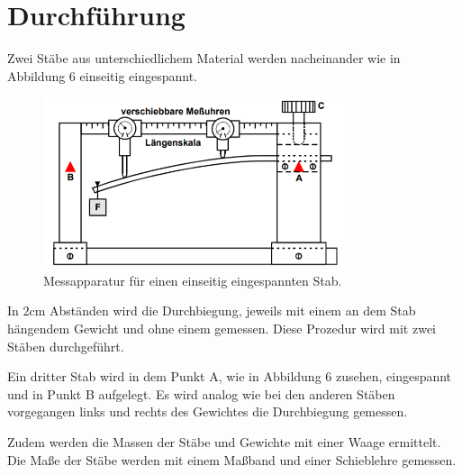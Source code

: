 \section{Durchführung}
\label{sec:Durchführung}


Zwei Stäbe aus unterschiedlichem Material werden nacheinander wie in Abbildung 6 einseitig eingespannt.

\begin{figure}[H]
  \centering
  \includegraphics[height=5cm]{einseitig.PNG}
  \caption{Messapparatur für einen einseitig eingespannten Stab. \cite{sample}}
  \label{fig:einseitig}
\end{figure}

In $2$cm Abständen wird die Durchbiegung, jeweils mit einem an dem Stab hängendem Gewicht
und ohne einem gemessen. Diese Prozedur wird mit zwei Stäben durchgeführt.

Ein dritter Stab wird in dem Punkt A, wie in Abbildung 6 zusehen, eingespannt und
in Punkt B aufgelegt. Es wird analog wie bei den anderen Stäben vorgegangen links
und rechts des Gewichtes die Durchbiegung gemessen.

Zudem werden die Massen der Stäbe und Gewichte mit einer Waage ermittelt. Die Maße der
Stäbe werden mit einem Maßband und einer Schieblehre gemessen.
